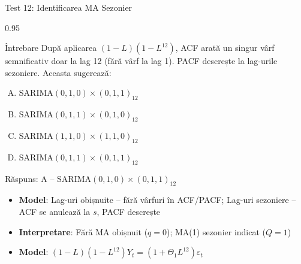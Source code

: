 \documentclass[9pt, aspectratio=169, t]{beamer}
\begin{document}
\begin{frame}{Test 12: Identificarea MA Sezonier}
    \begin{cminipage}{0.95\textwidth}
    \begin{alertblock}{Întrebare}
        După aplicarea $(1-L)(1-L^{12})$, ACF arată un singur vârf semnificativ doar la lag 12 (fără vârf la lag 1). PACF descrește la lag-urile sezoniere. Aceasta sugerează:
    \end{alertblock}

    \vspace{0.15cm}

    \begin{enumerate}[A)]\setlength{\itemsep}{0pt}
        \item SARIMA$(0,1,0) \times (0,1,1)_{12}$
        \item SARIMA$(0,1,1) \times (0,1,0)_{12}$
        \item SARIMA$(1,1,0) \times (1,1,0)_{12}$
        \item SARIMA$(0,1,1) \times (0,1,1)_{12}$
    \end{enumerate}

    \vspace{0.2cm}
    \pause
    \begin{exampleblock}{Răspuns: A -- SARIMA$(0,1,0) \times (0,1,1)_{12}$}
        {\footnotesize
        \begin{itemize}\setlength{\itemsep}{0pt}
        \item \textbf{Model}: Lag-uri obișnuite -- fără vârfuri în ACF/PACF; Lag-uri sezoniere -- ACF se anulează la $s$, PACF descrește
        \item \textbf{Interpretare}: Fără MA obișnuit ($q = 0$); MA(1) sezonier indicat ($Q = 1$)
        \item \textbf{Model}: $(1-L)(1-L^{12})Y_t = (1 + \Theta_1 L^{12})\varepsilon_t$
        \end{itemize}
        }
    \end{exampleblock}
    \end{cminipage}
\end{frame}
\end{document}
